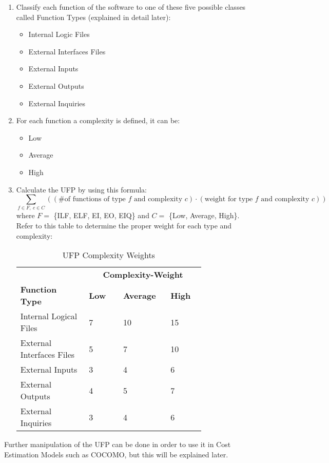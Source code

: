 \begin{enumerate}
	\item Classify each function of the software to one of these five possible classes called Function Types (explained in detail later):
	\begin{itemize}
		\item Internal Logic Files
		\item External Interfaces Files
		\item External Inputs
		\item External Outputs
		\item External Inquiries
	\end{itemize}
	\item For each function a complexity is defined, it can be:
	\begin{itemize}
		\item Low
		\item Average
		\item High
	\end{itemize}
	\item Calculate the UFP by using this formula:
	$$ \sum_{f \in F,\ c \in C} \left((\textrm{\# of functions of type } f \textrm{ and complexity } c) \cdot (\textrm{weight for type } f \textrm{ and complexity } c ) \right) $$
	where $F = $ \{ILF, ELF, EI, EO, EIQ\} and $C = $ \{Low, Average, High\}. \\
	Refer to this table to determine the proper weight for each type and complexity:
	\begin{table}[H]
	\centering
	\begin{tabular}{x{0.3\linewidth}x{0.15\linewidth}x{0.15\linewidth}x{0.15\linewidth}}
		\hline 
		&  \\
		\textbf{Function Type} & \textbf{Low} &\textbf{Average} & \textbf{High} \\
		\hline
		Internal Logical Files & 7 & 10 & 15 \\
		External Interfaces Files & 5 & 7 & 10 \\
		External Inputs & 3 & 4 & 6 \\
		External Outputs & 4 & 5 & 7 \\
		External Inquiries & 3 & 4 & 6 \\
		\hline
	\end{tabular}
	\caption{UFP Complexity Weights}
\end{table}
\end{enumerate}
Further manipulation of the UFP can be done in order to use it in Cost Estimation Models such as COCOMO, but this will be explained later.
